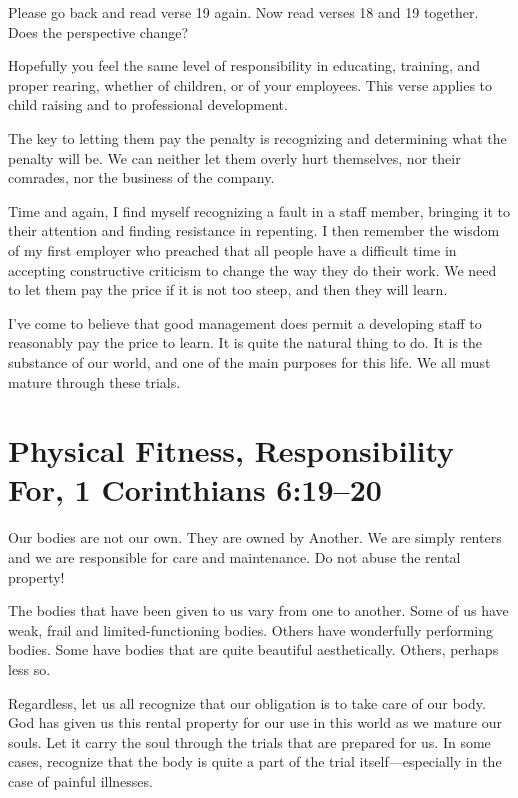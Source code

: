 \documentclass[12pt]{memoir}
\begin{document}
Please go back and read verse 19 again. Now read verses 18 and 19 together. Does the perspective change?

Hopefully you feel the same level of responsibility in educating, training, and proper rearing, whether of children, or of your employees. This verse applies to child raising and to professional development.

The key to letting them pay the penalty is recognizing and determining
what the penalty will be. We can neither let them overly hurt themselves, nor their comrades, nor the business of the company. 

Time and again, I find myself recognizing a fault in a staff member,
bringing it to their attention and finding resistance in repenting.
I then remember the wisdom of my first employer who preached that
all people have a difficult time in accepting constructive criticism
to change the way they do their work. We need to let them pay the
price if it is not too steep, and then they will learn.

I've come to believe that good management does permit a developing staff to reasonably pay the price to learn. It is quite the natural thing to do. It is the substance of our world, and one of the main purposes for this life. We all must mature through these trials.


\section[Physical Fitness, Responsibility for]{Physical Fitness, Responsibility For, 1 Corinthians 6:19--20}

Our bodies are not our own. They are owned by Another. We are simply
renters and we are responsible for care and maintenance. Do not abuse the rental property!

The bodies that have been given to us vary from one to another. Some of us have weak, frail and limited-functioning bodies. Others have wonderfully performing bodies. Some have bodies that are quite beautiful aesthetically. Others, perhaps less so.

Regardless, let us all recognize that our obligation is to take care of our body. God has given us this rental property for our use in this world as we mature our souls. Let it carry the soul through the trials that are prepared for us. In some cases, recognize that the body is quite a part of the trial itself---especially in the case of painful illnesses. 
\end{document}

